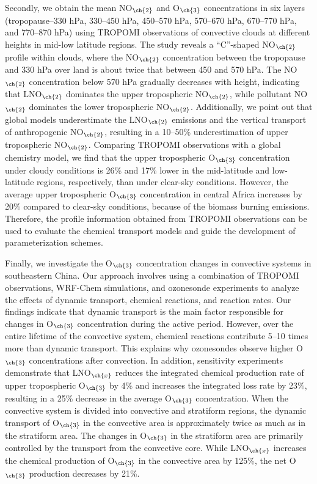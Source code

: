 {Secondly, we obtain the mean NO$_{\ch{2}}$ and O$_{\ch{3}}$ concentrations in six layers (tropopause--330 hPa, 330--450 hPa, 450--570 hPa, 570--670 hPa, 670--770 hPa, and 770--870 hPa) using TROPOMI observations of convective clouds at different heights in mid-low latitude regions.
The study reveals a ``C''-shaped NO$_{\ch{2}}$ profile within clouds, where the NO$_{\ch{2}}$ concentration between the tropopause and 330 hPa over land is about twice that between 450 and 570 hPa.
The NO$_{\ch{2}}$ concentration below 570 hPa gradually decreases with height, indicating that LNO$_{\ch{2}}$ dominates the upper tropospheric NO$_{\ch{2}}$, while pollutant NO$_{\ch{2}}$ dominates the lower tropospheric NO$_{\ch{2}}$.
Additionally, we point out that global models underestimate the LNO$_{\ch{2}}$ emissions and the vertical transport of anthropogenic NO$_{\ch{2}}$, resulting in a 10--50\% underestimation of upper tropospheric NO$_{\ch{2}}$.
Comparing TROPOMI observations with a global chemistry model, we find that the upper tropospheric O$_{\ch{3}}$ concentration under cloudy conditions is 26\% and 17\% lower in the mid-latitude and low-latitude regions, respectively, than under clear-sky conditions.
However, the average upper tropospheric O$_{\ch{3}}$ concentration in central Africa increases by 20\% compared to clear-sky conditions, because of the biomass burning emissions.
Therefore, the profile information obtained from TROPOMI observations can be used to evaluate the chemical transport models and guide the development of parameterization schemes.

Finally, we investigate the O$_{\ch{3}}$ concentration changes in convective systems in southeastern China.
Our approach involves using a combination of TROPOMI observations, WRF-Chem simulations, and ozonesonde experiments to analyze the effects of dynamic transport, chemical reactions, and reaction rates.
Our findings indicate that dynamic transport is the main factor responsible for changes in O$_{\ch{3}}$ concentration during the active period.
However, over the entire lifetime of the convective system, chemical reactions contribute 5--10 times more than dynamic transport.
This explains why ozonesondes observe higher O$_{\ch{3}}$ concentrations after convection.
In addition, sensitivity experiments demonstrate that LNO$_{\ch{x}}$ reduces the integrated chemical production rate of upper tropospheric O$_{\ch{3}}$ by 4\% and increases the integrated loss rate by 23\%,
resulting in a 25\% decrease in the average O$_{\ch{3}}$ concentration.
When the convective system is divided into convective and stratiform regions,
the dynamic transport of O$_{\ch{3}}$ in the convective area is approximately twice as much as in the stratiform area.
The changes in O$_{\ch{3}}$ in the stratiform area are primarily controlled by the transport from the convective core.
While LNO$_{\ch{x}}$ increases the chemical production of O$_{\ch{3}}$ in the convective area by 125\%, the net O$_{\ch{3}}$ production decreases by 21\%.

}

